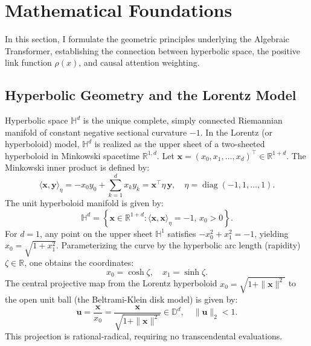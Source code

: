 \documentclass[11pt,a4paper]{article}
\theoremstyle{definition}
\newcommand{\diag}{\operatorname{diag}}
\begin{document}
\section{Mathematical Foundations}
\label{sec:foundations}

In this section, I formulate the geometric principles underlying the Algebraic Transformer, establishing the connection between hyperbolic space, the positive link function $\rho(x)$, and causal attention weighting.

\subsection{Hyperbolic Geometry and the Lorentz Model}
\label{subsec:lorentz}

Hyperbolic space $\mathbb{H}^d$ is the unique complete, simply connected Riemannian manifold of constant negative sectional curvature $-1$. In the Lorentz (or hyperboloid) model, $\mathbb{H}^d$ is realized as the upper sheet of a two-sheeted hyperboloid in Minkowski spacetime $\mathbb{R}^{1, d}$. Let $\mathbf{x} = (x_0, x_1, \dots, x_d)^\top \in \mathbb{R}^{1+d}$. The Minkowski inner product is defined by:
\begin{equation}
\langle \mathbf{x}, \mathbf{y} \rangle_\eta = -x_0 y_0 + \sum_{k=1}^d x_k y_k = \mathbf{x}^\top \eta \, \mathbf{y}, \quad \eta = \diag(-1, 1, \dots, 1).
\end{equation}
The unit hyperboloid manifold is given by:
\begin{equation}
\mathbb{H}^d = \left\{ \mathbf{x} \in \mathbb{R}^{1+d} : \langle \mathbf{x}, \mathbf{x} \rangle_\eta = -1, \, x_0 > 0 \right\}.
\end{equation}
For $d=1$, any point on the upper sheet $\mathbb{H}^1$ satisfies $-x_0^2 + x_1^2 = -1$, yielding $x_0 = \sqrt{1 + x_1^2}$. Parameterizing the curve by the hyperbolic arc length (rapidity) $\zeta \in \mathbb{R}$, one obtains the coordinates:
\begin{equation}
x_0 = \cosh \zeta, \quad x_1 = \sinh \zeta.
\end{equation}
The central projective map from the Lorentz hyperboloid $x_0 = \sqrt{1 + \|\mathbf{x}\|^2}$ to the open unit ball (the Beltrami-Klein disk model) is given by:
\begin{equation}
\label{eq:klein_projection}
\mathbf{u} = \frac{\mathbf{x}}{x_0} = \frac{\mathbf{x}}{\sqrt{1 + \|\mathbf{x}\|^2}} \in \mathbb{D}^d, \quad \|\mathbf{u}\|_2 < 1.
\end{equation}
This projection is rational-radical, requiring no transcendental evaluations.
\end{document}
